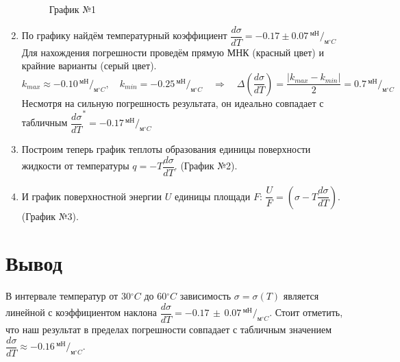 \documentclass[a4paper,12pt]{article}
\begin{document}
\begin{enumerate}
	
		\begin{figure}[h!]
			\caption[]{\label{fig:2} График №1}
		\end{figure}
	
	
		\item По графику найдём температурный коэффициент $\dfrac{d\sigma}{dT} = -0.17 \pm 0.07\, ^{мН}/_{м^\circ C}$
		Для нахождения погрешности проведём прямую МНК (красный цвет) и крайние варианты (серый цвет).
		$$k_{max} \approx -0.10\, ^{мН}/_{м^\circ C}, \quad k_{min} = -0.25\, ^{мН}/_{м^\circ C} \quad \Rightarrow \quad \Delta\left(\dfrac{d\sigma}{dT}\right) = \dfrac{|k_{max} - k_{min}|}{2} = 0.7\, ^{мН}/_{м^\circ C} $$
		Несмотря на сильную погрешность результата, он идеально совпадает с табличным $\dfrac{d\sigma}{dT}^{*} = -0.17\, ^{мН}/_{м^\circ C}$
	
		
		\item Построим теперь график теплоты образования единицы поверхности жидкости от температуры $q = -T\dfrac{d\sigma}{dT}$. (График №2).
	
	
		\item И график поверхностной энергии $U$ единицы площади $F$:  $\dfrac{U}{F} = (\sigma - T\dfrac{d\sigma}{dT})$. (График №3). 
		
\end{enumerate}
	
\section{Вывод}

	В интервале температур от 30$^\circ C$ до 60$^\circ C$ зависимость $\sigma = \sigma(T)$ является линейной с коэффициентом наклона $\dfrac{d\sigma}{dT} = -0.17\,\pm\, 0.07 \, ^{мН}/_{м^\circ C}$. Стоит отметить, что наш результат в пределах погрешности совпадает с табличным значением $\dfrac{d\sigma}{dT} \approx -0.16\, ^{мН}/_{м^\circ C}$. \\
	
\end{document}
